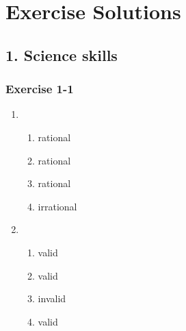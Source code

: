 \chapter{Exercise Solutions}

\section{1. Science skills}

\subsection{Exercise 1-1} %
\begin{enumerate}[noitemsep, label=\textbf{\arabic*}. ] 
\item %
  \begin{enumerate}[itemsep=5pt, label=\textbf{(\alph*)} ] 
    \item rational
    \item rational
    \item rational
    \item irrational
    \end{enumerate}
\item %
    \begin{enumerate}[itemsep=5pt, label=\textbf{(\alph*)} ] 
    \item valid
    \item valid
    \item invalid
    \item valid
    \end{enumerate}


\end{enumerate}
